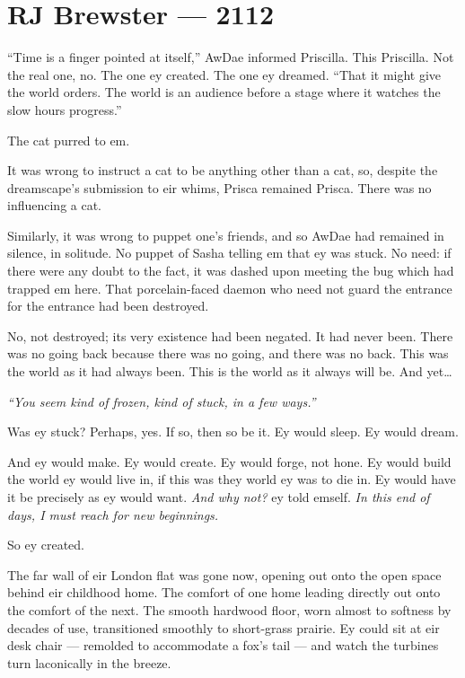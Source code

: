 \hypertarget{rj-brewster-2112}{%
\chapter*{RJ Brewster — 2112}\label{rj-brewster-2112}}

``Time is a finger pointed at itself,'' AwDae informed Priscilla. This Priscilla. Not the real one, no. The one ey created. The one ey dreamed. ``That it might give the world orders. The world is an audience before a stage where it watches the slow hours progress.''

The cat purred to em.

It was wrong to instruct a cat to be anything other than a cat, so, despite the dreamscape's submission to eir whims, Prisca remained Prisca. There was no influencing a cat.

Similarly, it was wrong to puppet one's friends, and so AwDae had remained in silence, in solitude. No puppet of Sasha telling em that ey was stuck. No need: if there were any doubt to the fact, it was dashed upon meeting the bug which had trapped em here. That porcelain-faced daemon who need not guard the entrance for the entrance had been destroyed.

No, not destroyed; its very existence had been negated. It had never been. There was no going back because there was no going, and there was no back. This was the world as it had always been. This is the world as it always will be. And yet\ldots{}

\emph{``You seem kind of frozen, kind of stuck, in a few ways.''}

Was ey stuck? Perhaps, yes. If so, then so be it. Ey would sleep. Ey would dream.

And ey would make. Ey would create. Ey would forge, not hone. Ey would build the world ey would live in, if this was they world ey was to die in. Ey would have it be precisely as ey would want. \emph{And why not?} ey told emself. \emph{In this end of days, I must reach for new beginnings.}

So ey created.

The far wall of eir London flat was gone now, opening out onto the open space behind eir childhood home. The comfort of one home leading directly out onto the comfort of the next. The smooth hardwood floor, worn almost to softness by decades of use, transitioned smoothly to short-grass prairie. Ey could sit at eir desk chair — remolded to accommodate a fox's tail — and watch the turbines turn laconically in the breeze.

